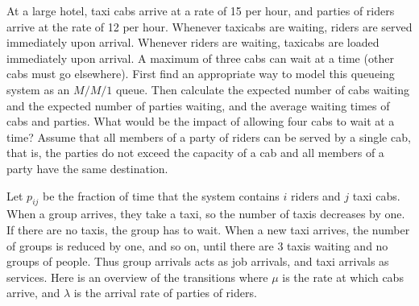 \begin{exercise}[Hall 5.22]\label{ex:95}
 At  a large hotel, taxi cabs arrive at a rate of 15 per hour, and parties of riders arrive at the rate of 12 per hour.
 Whenever taxicabs are waiting, riders are served immediately upon arrival.
 Whenever riders are waiting, taxicabs are loaded immediately upon arrival.
 A maximum of three cabs can wait at a time (other cabs must go elsewhere).
First find an appropriate way to model this queueing system as an $M/M/1$ queue. Then 
 calculate the expected number of cabs waiting and the expected number of parties waiting, and the average waiting times of cabs and parties.
 What would be the impact of allowing four cabs to wait at a time?
Assume that all members of a party of riders can be served by a single cab, that is, the parties do not exceed the capacity of a cab and all members of a party have the same destination.
\begin{hint}
  Let $p_{ij}$ be the fraction of time that the system contains $i$ riders and $j$ taxi cabs.
  When a group arrives, they take a taxi, so the number of taxis decreases by one. If there are no taxis, the group has to wait. 
  When a new taxi arrives, the number of groups is reduced by one, and so on, until there are $3$ taxis waiting and no groups of people.
Thus group arrivals acts as job arrivals, and taxi arrivals as services. 
Here is an overview of the transitions  where  $\mu$ is the rate at which cabs arrive, and $\lambda$ is the arrival rate of parties of riders.
 \begin{center}
\end{center}
\end{hint}
\end{exercise}
